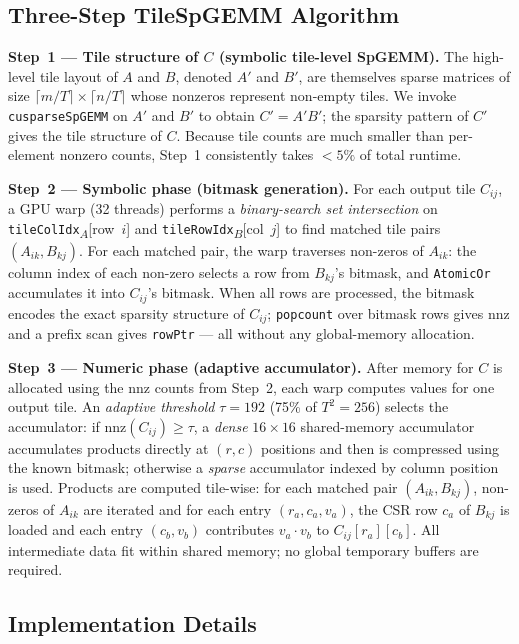 \documentclass[conference]{IEEEtran}
\begin{document}
\subsection{Three-Step TileSpGEMM Algorithm}

\textbf{Step~1 --- Tile structure of $C$ (symbolic tile-level SpGEMM).}
The high-level tile layout of $A$ and $B$, denoted $A'$ and $B'$, are
themselves sparse matrices of size $\lceil m/T\rceil \times \lceil n/T\rceil$
whose nonzeros represent non-empty tiles.
We invoke \texttt{cusparseSpGEMM} on $A'$ and $B'$ to obtain $C' = A'B'$;
the sparsity pattern of $C'$ gives the tile structure of $C$.
Because tile counts are much smaller than per-element nonzero counts,
Step~1 consistently takes $<5\%$ of total runtime.

\textbf{Step~2 --- Symbolic phase (bitmask generation).}
For each output tile $C_{ij}$, a GPU warp (32 threads) performs a
\emph{binary-search set intersection} on
\texttt{tileColIdx}\textsubscript{$A$}[row~$i$] and
\texttt{tileRowIdx}\textsubscript{$B$}[col~$j$] to find matched tile pairs
$(A_{ik}, B_{kj})$.
For each matched pair, the warp traverses non-zeros of $A_{ik}$: the
column index of each non-zero selects a row from $B_{kj}$'s bitmask, and
\texttt{AtomicOr} accumulates it into $C_{ij}$'s bitmask.
When all rows are processed, the bitmask encodes the exact sparsity
structure of $C_{ij}$; \texttt{popcount} over bitmask rows gives $\text{nnz}$
and a prefix scan gives \texttt{rowPtr} --- all without any global-memory
allocation.

\textbf{Step~3 --- Numeric phase (adaptive accumulator).}
After memory for $C$ is allocated using the nnz counts from Step~2,
each warp computes values for one output tile.
An \emph{adaptive threshold} $\tau = 192$ (75\% of $T^2 = 256$) selects
the accumulator:
if $\text{nnz}(C_{ij}) \geq \tau$, a \emph{dense} $16\!\times\!16$ shared-memory
accumulator accumulates products directly at $(r, c)$ positions and then
is compressed using the known bitmask;
otherwise a \emph{sparse} accumulator indexed by column position is used.
Products are computed tile-wise: for each matched pair $(A_{ik}, B_{kj})$,
non-zeros of $A_{ik}$ are iterated and for each entry $(r_a, c_a, v_a)$,
the CSR row $c_a$ of $B_{kj}$ is loaded and each entry $(c_b, v_b)$
contributes $v_a \cdot v_b$ to $C_{ij}[r_a][c_b]$.
All intermediate data fit within shared memory; no global temporary
buffers are required.

\subsection{Implementation Details}
\end{document}
